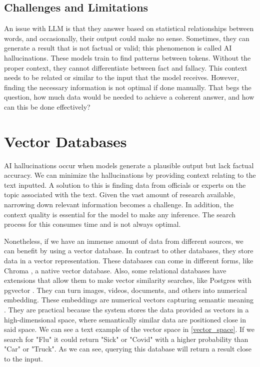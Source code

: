 \subsection{Challenges and Limitations}
An issue with LLM is that they answer based on statistical relationships between words, and occasionally, their output could make no sense. Sometimes, they can generate a result that is not factual
or valid; this phenomenon is called AI hallucinations. These models train to find patterns between tokens. Without the proper context, they cannot differentiate between fact and fallacy. This context
needs to  be related or similar to the input that the model receives. However, finding the necessary information is not optimal if done manually. That begs the question, how much data would be needed
to achieve a coherent answer, and how can this be done effectively?


\section{Vector Databases}
AI hallucinations occur when models generate a plausible output but lack factual accuracy. We can minimize the hallucinations by providing context relating to the text inputted. A solution to this
is finding data from officials or experts on the topic associated with the text. Given the vast amount of research available, narrowing down relevant information becomes a challenge. In addition,
the context quality is essential for the model to make any inference. The search process for this consumes time and is not always optimal. 

Nonetheless, if we have an immense amount of data from different sources, we can benefit by using a vector database. In contrast to other databases, they store data in a vector representation.
These databases can come in different forms, like Chroma \cite{chroma}, a native vector database. Also, some relational databases have extensions that allow them to make vector similarity searches,
like Postgres with pgvector \cite{pgvector}. They can turn images, videos, documents, and others into numerical embedding. These embeddings are numerical vectors capturing semantic meaning \cite{10455990}.
They are practical because the system stores the data provided as vectors in a high-dimensional space, where semantically similar data are positioned close in said space. We can see a text example of the vector
space in \ref{vector_space}. If we search for "Flu" it could return "Sick" or "Covid" with a higher probability than "Car" or "Truck". As we can see, querying this database will return a result close to the input.

